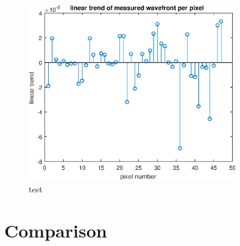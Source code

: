 \documentclass[11pt, oneside,a4paper,fleqn]{report}
\begin{document}
\begin{figure}[H]
  \centering
  \includegraphics[width=0.8\textwidth]{figures/linear_trend.eps}
  \caption{test}
  \label{fig:linear_trend}
\end{figure}





\chapter{\bf Comparison}

 

\end{document}
